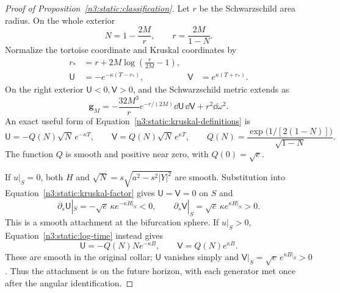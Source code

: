 \begin{proof}[Proof of Proposition~\ref{n3:static:classification}]
Let \(r\) be the Schwarzschild area radius. On the whole exterior
\[
N=1-\frac{2M}{r},\qquad
r=\frac{2M}{1-N}.
\]
Normalize the tortoise coordinate and Kruskal coordinates by
\begin{equation}
\label{n3:static:kruskal-definitions}
\begin{aligned}
r_*&=r+2M\log\left(\frac r{2M}-1\right),\\
\mathsf U&=-e^{-\kappa(T-r_*)},&
\mathsf V&= e^{\kappa(T+r_*)}.
\end{aligned}
\end{equation}
On the right exterior \(\mathsf U<0,\mathsf V>0\), and
the Schwarzschild metric extends as
\[
\mathbf g_M
=-\frac{32M^3}{r}e^{-r/(2M)}
   \dd\mathsf U\,\dd\mathsf V+r^2\dd\omega^2.
\]
An exact useful form of Equation~\eqref{n3:static:kruskal-definitions}
is
\begin{equation}
\label{n3:static:kruskal-factor}
\mathsf U=-Q(N)\sqrt N\,e^{-\kappa T},\qquad
\mathsf V= Q(N)\sqrt N\,e^{\kappa T},\qquad
Q(N)=\frac{\exp\!\bigl(1/[2(1-N)]\bigr)}{\sqrt{1-N}}.
\end{equation}
The function \(Q\) is smooth and positive near zero, with
\(Q(0)=\sqrt e\).

If \(u|_S=0\), both \(H\) and
\(\sqrt N=s\sqrt{a^2-s^2|Y|^2}\) are smooth.
Substitution into Equation~\eqref{n3:static:kruskal-factor} gives
\(\mathsf U=\mathsf V=0\) on \(S\) and
\[
\partial_s\mathsf U|_S
=-\sqrt e\,\kappa e^{-\kappa H|_S}<0,\qquad
\partial_s\mathsf V|_S
=\sqrt e\,\kappa e^{\kappa H|_S}>0.
\]
This is a smooth attachment at the bifurcation sphere.
If \(u|_S>0\), Equation~\eqref{n3:static:log-time} instead gives
\begin{equation}
\label{n3:static:future-attachment}
\mathsf U=-Q(N)N e^{-\kappa B},\qquad
\mathsf V=Q(N)e^{\kappa B}.
\end{equation}
These are smooth in the original collar;
\(\mathsf U\) vanishes simply and
\(\mathsf V|_S=\sqrt e\,e^{\kappa B|_S}>0\).
Thus the attachment is on the future horizon, with each generator
met once after the angular identification.


\end{proof}
